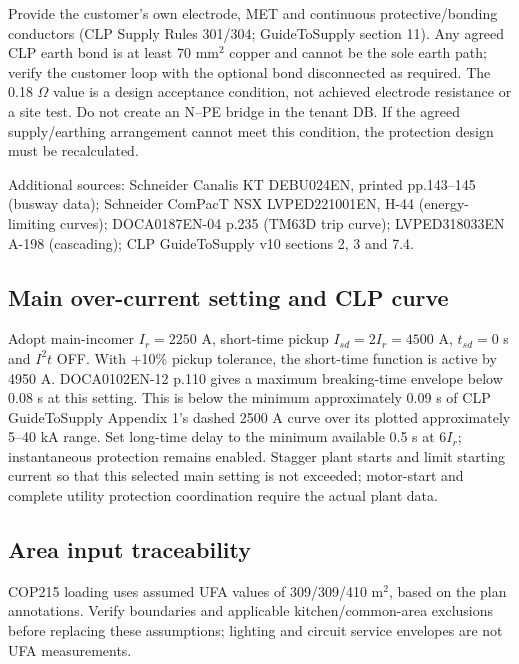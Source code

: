 Provide the customer's own electrode, MET and continuous protective/bonding conductors (CLP Supply Rules 301/304; GuideToSupply section 11). Any agreed CLP earth bond is at least 70 mm$^2$ copper and cannot be the sole earth path; verify the customer loop with the optional bond disconnected as required. The 0.18 $\Omega$ value is a design acceptance condition, not achieved electrode resistance or a site test. Do not create an N--PE bridge in the tenant DB. If the agreed supply/earthing arrangement cannot meet this condition, the protection design must be recalculated.

\noindent Additional sources: Schneider Canalis KT DEBU024EN, printed pp.143--145 (busway data); Schneider ComPacT NSX LVPED221001EN, H-44 (energy-limiting curves); DOCA0187EN-04 p.235 (TM63D trip curve); LVPED318033EN A-198 (cascading); CLP GuideToSupply v10 sections 2, 3 and 7.4.


\subsection*{Main over-current setting and CLP curve}
Adopt main-incomer $I_r=2250$ A, short-time pickup $I_{sd}=2I_r=4500$ A, $t_{sd}=0$ s and $I^2t$ OFF. With +10\% pickup tolerance, the short-time function is active by 4950 A. DOCA0102EN-12 p.110 gives a maximum breaking-time envelope below 0.08 s at this setting. This is below the minimum approximately 0.09 s of CLP GuideToSupply Appendix 1's dashed 2500 A curve over its plotted approximately 5--40 kA range. Set long-time delay to the minimum available 0.5 s at $6I_r$; instantaneous protection remains enabled. Stagger plant starts and limit starting current so that this selected main setting is not exceeded; motor-start and complete utility protection coordination require the actual plant data.

\subsection*{Area input traceability}
COP215 loading uses assumed UFA values of 309/309/410 m$^2$, based on the plan annotations. Verify boundaries and applicable kitchen/common-area exclusions before replacing these assumptions; lighting and circuit service envelopes are not UFA measurements.
